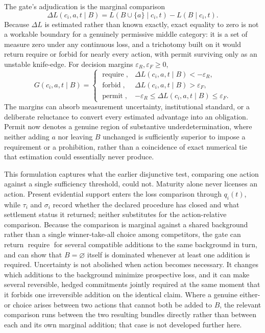 \documentclass[11pt]{article}
\begin{document}
The gate's adjudication is the marginal comparison
\[
\Delta L(c_i, a, t \mid B) = L(B \cup \{a\} \mid c_i, t) - L(B \mid c_i, t).
\]
Because $\Delta L$ is estimated rather than known exactly, exact equality to zero is not a workable boundary for a genuinely permissive middle category: it is a set of measure zero under any continuous loss, and a trichotomy built on it would return require or forbid for nearly every action, with permit surviving only as an unstable knife-edge. For decision margins $\varepsilon_R, \varepsilon_F \geq 0$,
\[
G(c_i, a, t \mid B) =
\begin{cases}
\operatorname{require}, & \Delta L(c_i, a, t \mid B) < -\varepsilon_R,\\[4pt]
\operatorname{forbid}, & \Delta L(c_i, a, t \mid B) > \varepsilon_F,\\[4pt]
\operatorname{permit}, & -\varepsilon_R \leq \Delta L(c_i, a, t \mid B) \leq \varepsilon_F.
\end{cases}
\]
The margins can absorb measurement uncertainty, institutional standard, or a deliberate reluctance to convert every estimated advantage into an obligation. Permit now denotes a genuine region of substantive underdetermination, where neither adding $a$ nor leaving $B$ unchanged is sufficiently superior to impose a requirement or a prohibition, rather than a coincidence of exact numerical tie that estimation could essentially never produce.

This formulation captures what the earlier disjunctive test, comparing one action against a single sufficiency threshold, could not. Maturity alone never licenses an action. Present evidential support enters the loss comparison through $q_i(t)$, while $\tau_i$ and $\sigma_i$ record whether the declared procedure has closed and what settlement status it returned; neither substitutes for the action-relative comparison. Because the comparison is marginal against a shared background rather than a single winner-take-all choice among competitors, the gate can return $\operatorname{require}$ for several compatible additions to the same background in turn, and can show that $B = \varnothing$ itself is dominated whenever at least one addition is required. Uncertainty is not abolished when action becomes necessary. It changes which additions to the background minimize prospective loss, and it can make several reversible, hedged commitments jointly required at the same moment that it forbids one irreversible addition on the identical claim. Where a genuine either-or choice arises between two actions that cannot both be added to $B$, the relevant comparison runs between the two resulting bundles directly rather than between each and its own marginal addition; that case is not developed further here.
\end{document}

